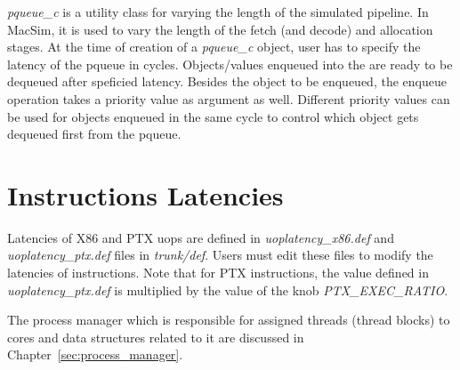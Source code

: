 \textit{pqueue\_c} is a utility class for varying the length of the simulated
pipeline. In MacSim, it is used to vary the length of the fetch (and decode)
  and allocation stages. At the time of creation of a \textit{pqueue\_c}
  object, user has to specify the latency of the pqueue in cycles.
  Objects/values enqueued into the are ready to be dequeued after speficied
  latency. Besides the object to be enqueued, the enqueue operation takes a
  priority value as argument as well. Different priority values can be used for
  objects enqueued in the same cycle to control which object gets dequeued
  first from the pqueue.


\section{Instructions Latencies}

Latencies of X86 and PTX uops are defined in \textit{uoplatency\_x86.def} and
\textit{uoplatency\_ptx.def} files in \textit{trunk/def}. Users must edit these
files to modify the latencies of instructions. Note that for PTX instructions,
      the value defined in \textit{uoplatency\_ptx.def} is multiplied by the
      value of the knob \textit{PTX\_EXEC\_RATIO}.


The process manager which is responsible for assigned threads (thread blocks)
  to cores and data structures related to it are discussed in
  Chapter~\ref{sec:process_manager}.
